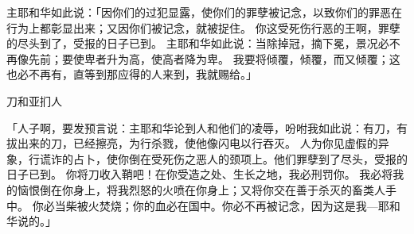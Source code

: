 {\par }{\PP {}主耶和华如此说：「因你们的过犯显露，使你们的罪孽被记念，以致你们的罪恶在行为上都彰显出来；又因你们被记念，就被捉住。
你这受死伤行恶的{}王啊，罪孽的尽头到了，受报的日子已到。
主耶和华如此说：当除掉冠，摘下冕，景况必不再像先前；要使卑者升为高，使高者降为卑。
我要将{}倾覆，倾覆，而又倾覆；这{}也必不再有，直等到那应得的人来到，我就赐给{}。」
\par }{\SH 刀和亚扪人
\par }{\PP {}「人子啊，要发预言说：主耶和华论到{}人和他们的凌辱，吩咐我如此说：有刀，有拔出来的刀，已经擦亮，为行杀戮，使他像闪电以行吞灭。
人为你见虚假的异象，行谎诈的占卜，使你倒在受死伤之恶人的颈项上。他们罪孽到了尽头，受报的日子已到。
你将刀收入鞘吧！在你受造之处、生长之地，我必刑罚你。
我必将我的恼恨倒在你身上，将我烈怒的火喷在你身上；又将你交在善于杀灭的畜类人手中。
你必当柴被火焚烧；你的血必{}在国中。你必不再被记念，因为这是我—耶和华说的。」

}

